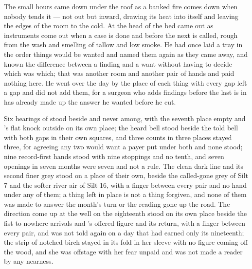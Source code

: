 \scenebreak

The small hours came down under the roof as a banked fire comes down when nobody tends it --- not out but inward, drawing its heat into itself and leaving the edges of the room to the cold. At the head of the bed  came out as instruments come out when a case is done and before the next is called, rough from the wash and smelling of tallow and low smoke. He had once laid a tray in the order things would be wanted and named them again as they came away, and known the difference between a finding and a want without having to decide which was which; that was another room and another pair of hands and paid nothing here. He went over the day by the place of each thing with every gap left a gap and did not add them, for a surgeon who adds findings before the last is in has already made up the answer he wanted before he cut.

Six hearings of  stood beside and never among, with the seventh place empty and 's flat knock outside on its own place; the heard bell stood beside the told bell with both gaps in their own squares, and three counts in three places stayed three, for agreeing any two would want a payer put under both and none stood; nine record-first hands stood with nine stoppings and no tenth, and seven openings in seven months were seven and not a rule. The clean dark line and its second finer grey stood on a place of their own, beside the called-gone grey of Silt 7 and the softer river air of Silt 16, with a finger between every pair and no hand under any of them; a thing left in place is not a thing forgiven, and none of them was made to answer the month's turn or the reading gone up the road. The direction come up at the well on the eighteenth stood on its own place beside the fist-to-nowhere arrivals and 's offered figure and its return, with a finger between every pair, and was not told again on a day that had earned only its nineteenth; the strip of notched birch stayed in its fold in her sleeve with no figure coming off the wood, and she was offstage with her fear unpaid and was not made a reader by any nearness.


